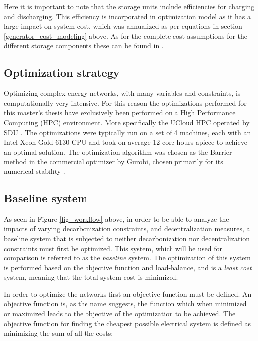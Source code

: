 \documentclass[preprint,12pt,nopreprintline]{elsarticle}
\begin{document}
\medskip
\noindent
Here it is important to note that the storage units include efficiencies for charging and discharging. This efficiency is incorporated in optimization model as it has a large impact on system cost, which was annualized as per equations in section \ref{generator_cost_modeling} above. As for the complete cost assumptions for the different storage components these can be found in .


\subsection{Optimization strategy}
\noindent
Optimizing complex energy networks, with many variables and constraints, is computationally very intensive. For this reason the optimizations performed for this master's thesis have exclusively been performed on a High Performance Computing (HPC) environment. More specifically the UCloud HPC operated by SDU \cite{UCloudUserGuide}. The optimizations were typically run on a set of 4 machines, each with an Intel Xeon Gold 6130 CPU and took on average 12 core-hours apiece to achieve an optimal solution. The optimization algorithm was chosen as the Barrier method in the commercial optimizer by Gurobi, chosen primarily for its numerical stability \cite{BarrierLoggingGurobi}.

\subsection{Baseline system}
\noindent
As seen in Figure \ref{fig_workflow} above, in order to be able to analyze the impacts of varying decarbonization constraints, and decentralization measures, a baseline system that is subjected to neither decarbonization nor decentralization constraints must first be optimized. This system, which will be used for comparison is referred to as the \textit{baseline} system. The optimization of this system is performed based on the objective function and load-balance, and is a \textit{least cost} system, meaning that the total system cost is minimized.

\medskip
\noindent In order to optimize the networks first an objective function must be defined. An objective function is, as the name suggests, the function which when minimized or maximized leads to the objective of the optimization to be achieved. The objective function for finding the cheapest possible electrical system is defined as minimizing the sum of all the costs:
\end{document}
